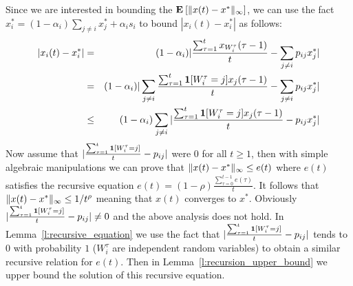 Since we are interested in bounding the $\bm{\mathrm{E}}_{} \left[ \| x(t)-x^* \|_{\infty} \right]$, we 
can use the fact $x_i^*= (1-\alpha_i)\sum_{j \neq i}x_j^* + \alpha_is_i$ to bound $|x_i(t)-x_i^*|$ as follows: 
\begin{eqnarray*}
 |x_i(t)-x_i^*| &=& (1-\alpha_i)|\frac{\sum_{\tau=1}^{t} x_{W_i^\tau}(\tau-1)}{t}-\sum_{j\neq i} p_{ij}x_j^*|\\
 &=& (1-\alpha_i)|\sum_{j\neq i}\frac{\sum_{\tau=1}^{t} \bm{1}{\left[W_i^\tau=j\right]}x_j(\tau-1)}{t}-\sum_{j\neq i} p_{ij}x_j^*|\\
 &\leq& (1-\alpha_i)\sum_{j\neq i}|\frac{\sum_{\tau=1}^{t} \bm{1}{\left[W_i^\tau=j\right]}x_j(\tau-1)}{t}- p_{ij}x_j^*|
\end{eqnarray*}
Now assume that $|\frac{\sum_{\tau=1}^{t} \bm{1}{\left[W_i^{\tau}=j\right]}}{t}- p_{ij}|$ were $0$ for all $t\geq 1$, 
then with simple algebraic manipulations we can prove that $\| x(t)-x^* \|_{\infty} \leq e(t)$
where $e(t)$ satisfies the recursive equation $e(t) = (1-\rho)\frac{\sum_{\tau=0}^{t-1}e(\tau)}{t}$.
It follows that $\| x(t)-x^* \|_{\infty} \leq 1/t^\rho$ meaning that $x(t)$ converges to $x^*$.
Obviously $|\frac{\sum_{\tau=1}^{t} \bm{1}{\left[W_i^{\tau}=j\right]}}{t} - p_{ij}|\neq 0$ and 
the above analysis does not hold. In Lemma~\ref{l:recursive_equation} we use the 
fact that $|\frac{\sum_{\tau=1}^{t} \bm{1}{\left[W_i^{\tau}=j\right]}}{t} - p_{ij}|$ tends to $0$ with probability $1$
($W_i^{\tau}$ are independent random variables)
to obtain a similar recursive relation for $e(t)$. Then in Lemma~\ref{l:recursion_upper_bound} 
we upper bound the solution of this recursive equation.

